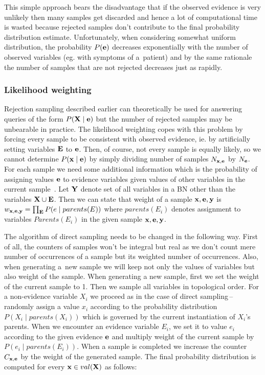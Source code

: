 \documentclass[english,cover]{fitthesis} %
\newcommand{\vars}[1]{{\bold{#1}}}         %
\begin{document}
This simple approach bears the disadvantage that if the observed evidence is very unlikely then many samples get discarded and hence a lot of computational time is wasted because rejected samples don't contribute to the final probability distribution estimate. Unfortunately, when considering somewhat uniform distribution, the probability $P(\vars{e})$ decreases exponentially with the number of observed variables (eg. with symptoms of a~patient) and by the same rationale the number of samples that are not rejected decreases just as rapidly.

\subsubsection{Likelihood weighting}
Rejection sampling described earlier can theoretically be used for answering queries of the form $P(\vars{X} \mid \vars{e})$ but the number of rejected samples may be unbearable in practice. The likelihood weighting copes with this problem by forcing every sample to be consistent with observed evidence, ie. by artificially setting variables $\vars{E}$ to $\vars{e}$. Then, of course, not every sample is equally likely, so we cannot determine $P(\vars{x} \mid \vars{e})$ by simply dividing number of samples $N_{\vars{x},\vars{e}}$ by $N_\vars{e}$. For each sample we need some additional information which is the probability of assigning values $\vars{e}$ to evidence variables given values of other variables in the current sample~\cite[p.~514]{russell_norvig_ed2}. Let $\vars{Y}$ denote set of all variables in a BN other than the variables $\vars{X} \cup \vars{E}$. Then we can state that weight of a sample $\vars{x},\vars{e}, \vars{y}$ is $w_{\vars{x},\vars{e}, \vars{y}} = \prod_\vars{E} P(e \mid parents(E))$ where $parents(E_i)$ denotes assignment to variables $Parents(E_i)$ in the given sample $\vars{x},\vars{e}, \vars{y}$.

The algorithm of direct sampling needs to be changed in the following way. First of all, the counters of samples won't be integral but real as we don't count mere number of occurrences of a sample but its weighted number of occurrences. Also, when generating a~new sample we will keep not only the values of variables but also weight of the sample. When generating a new sample, first we set the weight of the current sample to 1. Then we sample all variables in topological order. For a non-evidence variable $X_i$ we proceed as in the case of direct sampling\,--\,randomly assign a value $x_i$ according to the probability distribution $P(X_i \mid parents(X_i))$ which is governed by the current instantiation of $X_i$'s parents. When we encounter an evidence variable $E_i$, we set it to value $e_i$ according to the given evidence $\vars{e}$ and multiply weight of the current sample by $P(e_i \mid parents(E_i))$. When a sample is completed we increase the counter $C_{\vars{x},\vars{e}}$ by the weight of the generated sample. The final probability distribution is computed for every $\vars{x} \in val(\vars{X})$ as follows:
\end{document}
